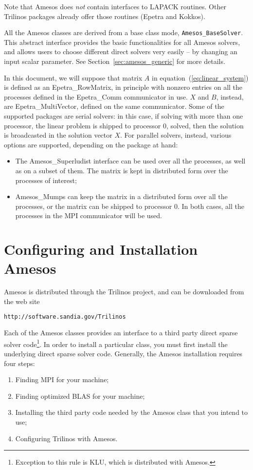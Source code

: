 \documentclass[11pt,letter]{article}
\begin{document}
Note that Amesos does {\sl not} contain interfaces to LAPACK routines.
Other Trilinos packages already offer those routines (Epetra and
Kokkos).

All the Amesos classes are derived from a base class mode,
\verb!Amesos_BaseSolver!. This abstract interface provides the basic
functionalities for all Amesos solvers, and allows users to choose
different direct solvers very easily -- by changing an input scalar
parameter. See Section~\ref{sec:amesos_generic} for more details.

In this document, we will suppose that matrix $A$ in
equation~(\ref{eq:linear_system}) is defined as an Epetra\_RowMatrix, in
principle with nonzero entries on all the processes defined in the
Epetra\_Comm communicator in use. $X$ and $B$, instead, are
Epetra\_MultiVector, defined on the same communicator.  Some of the
supported packages are serial solvers: in this case, if solving with
more than one processor, the linear problem is shipped to processor 0,
solved, then the solution is broadcasted in the solution vector $X$. For
parallel solvers, instead, various options are supported, depending on
the package at hand:
\begin{itemize}
\item The Amesos\_Superludist interface can be used over all the
  processes, as well as on a subset of them. The matrix is kept in
  distributed form over the processes of interest;
\item Amesos\_Mumps can keep the matrix in a distributed form over all
  the processes, or the matrix can be shipped to processor 0. In both
  cases, all the processes in the MPI communicator will be used.
\end{itemize}



\section{Configuring and Installation Amesos}
\label{sec:3pl}

Amesos is distributed through the Trilinos project, and can be
downloaded from the web site
\begin{verbatim}
http://software.sandia.gov/Trilinos
\end{verbatim}

\smallskip

Each of the Amesos classes provides an interface to a third party direct
sparse solver code\footnote{Exception to this rule is KLU, which is
  distributed with Amesos.}. In order to install a particular class, you
must first install the underlying direct sparse solver code. Generally,
the Amesos installation requires four steps:
\begin{enumerate}
\item Finding MPI for your machine;
\item Finding optimized BLAS for your machine;
\item Installing the third party code needed by the Amesos class that
  you intend to use;
\item Configuring Trilinos with Amesos. 
\end{enumerate}
\end{document}
